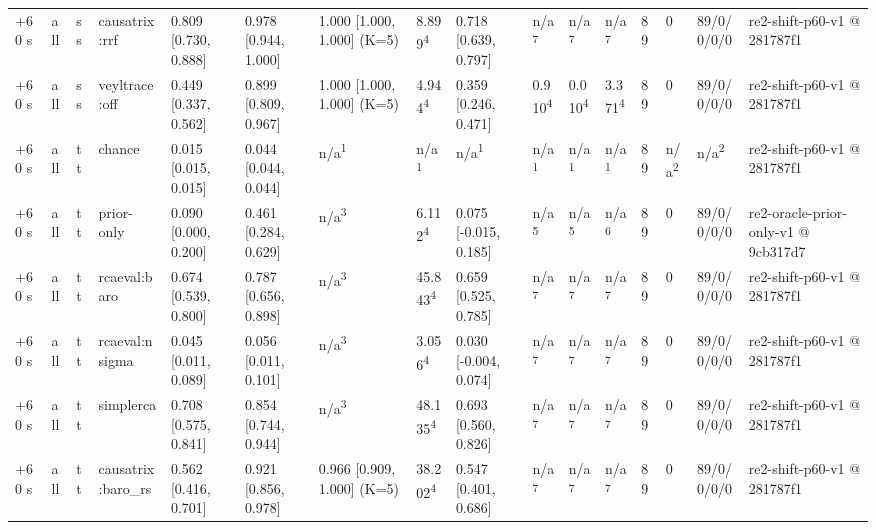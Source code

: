 \begin{table}[t]
\begin{tabular}{llllllllllllllll}
+60 s & all & ss & causatrix:rrf & 0.809 [0.730, 0.888] & 0.978 [0.944, 1.000] & 1.000 [1.000, 1.000] (K=5) & 8.899\textsuperscript{4} & 0.718 [0.639, 0.797] & n/a\textsuperscript{7} & n/a\textsuperscript{7} & n/a\textsuperscript{7} & 89 & 0 & 89/0/0/0/0 & re2-shift-p60-v1 @ 281787f1 \\
+60 s & all & ss & veyltrace:off & 0.449 [0.337, 0.562] & 0.899 [0.809, 0.967] & 1.000 [1.000, 1.000] (K=5) & 4.944\textsuperscript{4} & 0.359 [0.246, 0.471] & 0.910\textsuperscript{4} & 0.010\textsuperscript{4} & 3.371\textsuperscript{4} & 89 & 0 & 89/0/0/0/0 & re2-shift-p60-v1 @ 281787f1 \\
+60 s & all & tt & chance & 0.015 [0.015, 0.015] & 0.044 [0.044, 0.044] & n/a\textsuperscript{1} & n/a\textsuperscript{1} & n/a\textsuperscript{1} & n/a\textsuperscript{1} & n/a\textsuperscript{1} & n/a\textsuperscript{1} & 89 & n/a\textsuperscript{2} & n/a\textsuperscript{2} & re2-shift-p60-v1 @ 281787f1 \\
+60 s & all & tt & prior-only & 0.090 [0.000, 0.200] & 0.461 [0.284, 0.629] & n/a\textsuperscript{3} & 6.112\textsuperscript{4} & 0.075 [-0.015, 0.185] & n/a\textsuperscript{5} & n/a\textsuperscript{5} & n/a\textsuperscript{6} & 89 & 0 & 89/0/0/0/0 & re2-oracle-prior-only-v1 @ 9cb317d7 \\
+60 s & all & tt & rcaeval:baro & 0.674 [0.539, 0.800] & 0.787 [0.656, 0.898] & n/a\textsuperscript{3} & 45.843\textsuperscript{4} & 0.659 [0.525, 0.785] & n/a\textsuperscript{7} & n/a\textsuperscript{7} & n/a\textsuperscript{7} & 89 & 0 & 89/0/0/0/0 & re2-shift-p60-v1 @ 281787f1 \\
+60 s & all & tt & rcaeval:nsigma & 0.045 [0.011, 0.089] & 0.056 [0.011, 0.101] & n/a\textsuperscript{3} & 3.056\textsuperscript{4} & 0.030 [-0.004, 0.074] & n/a\textsuperscript{7} & n/a\textsuperscript{7} & n/a\textsuperscript{7} & 89 & 0 & 89/0/0/0/0 & re2-shift-p60-v1 @ 281787f1 \\
+60 s & all & tt & simplerca & 0.708 [0.575, 0.841] & 0.854 [0.744, 0.944] & n/a\textsuperscript{3} & 48.135\textsuperscript{4} & 0.693 [0.560, 0.826] & n/a\textsuperscript{7} & n/a\textsuperscript{7} & n/a\textsuperscript{7} & 89 & 0 & 89/0/0/0/0 & re2-shift-p60-v1 @ 281787f1 \\
+60 s & all & tt & causatrix:baro\_rs & 0.562 [0.416, 0.701] & 0.921 [0.856, 0.978] & 0.966 [0.909, 1.000] (K=5) & 38.202\textsuperscript{4} & 0.547 [0.401, 0.686] & n/a\textsuperscript{7} & n/a\textsuperscript{7} & n/a\textsuperscript{7} & 89 & 0 & 89/0/0/0/0 & re2-shift-p60-v1 @ 281787f1 \\

\end{tabular}
\end{table}
